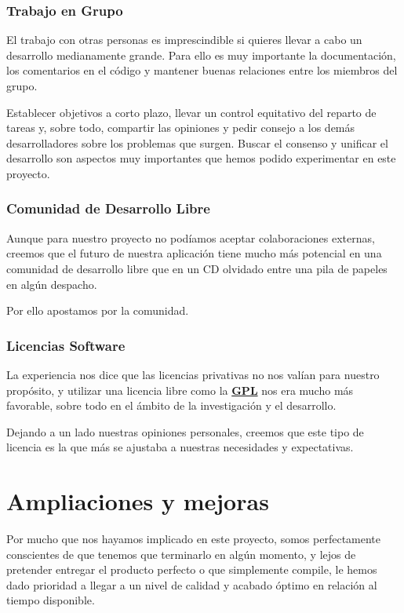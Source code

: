 \subsubsection*{Trabajo en Grupo}

El trabajo con otras personas es imprescindible si quieres llevar a cabo un
desarrollo medianamente grande. Para ello es muy importante la documentación,
los comentarios en el código y mantener buenas relaciones entre los miembros del
grupo.

Establecer objetivos a corto plazo, llevar un control equitativo del reparto de
tareas y, sobre todo, compartir las opiniones y pedir consejo a los demás
desarrolladores sobre los problemas que surgen. Buscar el consenso y unificar el
desarrollo son aspectos muy importantes que hemos podido experimentar en este
proyecto.

\subsubsection*{Comunidad de Desarrollo Libre}

Aunque para nuestro proyecto no podíamos aceptar colaboraciones externas,
creemos que el futuro de nuestra aplicación tiene mucho más potencial en una
comunidad de desarrollo libre que en un CD olvidado entre una pila de papeles
en algún despacho.

Por ello apostamos por la comunidad.

\subsubsection*{Licencias Software}

La experiencia nos dice que las licencias privativas no nos valían para
nuestro propósito, y utilizar una licencia libre como la \hyperref[ap1]{\bf GPL}
nos era mucho más favorable, sobre todo en el ámbito de la investigación y el
desarrollo.

Dejando a un lado nuestras opiniones personales, creemos que este tipo de
licencia es la que más se ajustaba a nuestras necesidades y expectativas.

\section*{Ampliaciones y mejoras}

Por  mucho que nos hayamos implicado en este proyecto, somos perfectamente
conscientes de que tenemos que terminarlo en algún momento, y lejos de
pretender entregar el producto perfecto o que simplemente compile, le hemos
dado prioridad a llegar a un nivel de calidad y acabado óptimo en relación al
tiempo disponible.


